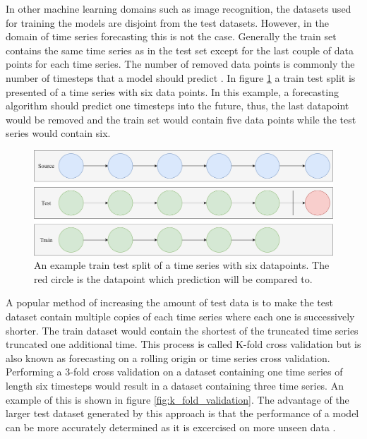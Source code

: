 In other machine learning domains such as image recognition, the datasets used for training the models are disjoint from the test datasets. However, in the domain of time series forecasting this is not the case. Generally the train set contains the same time series as in the test set except for the last couple of data points for each time series. The number of removed data points is commonly the number of timesteps that a model should predict \cite{hyndman_forecasting_3rd}. In figure \ref{fig:train_test_split} a train test split is presented of a time series with six data points. In this example, a forecasting algorithm should predict one timesteps into the future, thus, the last datapoint would be removed and the train set would contain five data points while the test series would contain six.

\begin{figure}[htb]
    \centering
    \includegraphics[width=\linewidth]{./img/train_test_split.png}
    \caption{An example train test split of a time series with six datapoints. The red circle is the datapoint which prediction will be compared to.}
    \label{fig:train_test_split}
    \endminipage\hfill
\end{figure}


A popular method of increasing the amount of test data is to make the test dataset contain multiple copies of each time series where each one is successively shorter. The train dataset would contain the shortest of the truncated time series truncated one additional time. This process is called K-fold cross validation but is also known as forecasting on a rolling origin or time series cross validation. Performing a 3-fold cross validation on a dataset containing one time series of length six timesteps would result in a dataset containing three time series. An example of this is shown in figure \ref{fig:k_fold_validation}. The advantage of the larger test dataset generated by this approach is that the performance of a model can be more accurately determined as it is excercised on more unseen data \cite{hyndman_forecasting_3rd}.

